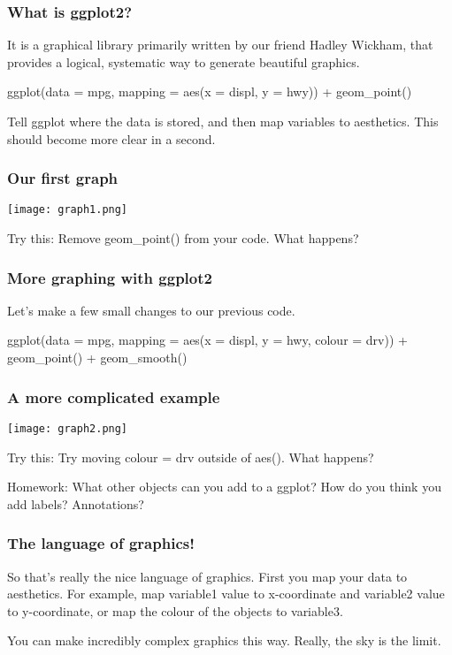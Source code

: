 \documentclass[aspectratio=169]{beamer}
\begin{document}
	\begin{frame}[fragile]
		\frametitle{What is ggplot2?}
		It is a graphical library primarily written by our friend Hadley Wickham, that provides a logical, systematic way to generate beautiful graphics.
		
		\begin{semiverbatim}
        ggplot(data = mpg, mapping = aes(x = displ, y = hwy)) + 
        geom_point()
		\end{semiverbatim}
	
	Tell ggplot where the data is stored, and then map variables to aesthetics. This should become more clear in a second.
		
	\end{frame}

	\begin{frame}[fragile]
	\frametitle{Our first graph}
	
	\begin{center}
		\texttt{[image: graph1.png]}
	\end{center}
	Try this: Remove geom\_point() from your code. What happens?
	
	\end{frame}

	\begin{frame}[fragile]
		\frametitle{More graphing with ggplot2}
		
		Let's make a few small changes to our previous code.
		
		\begin{semiverbatim}
 ggplot(data = mpg, mapping = aes(x = displ, y = hwy, colour = drv)) + 
 geom_point() + geom_smooth()
		\end{semiverbatim}
		
	\end{frame}

	\begin{frame}[fragile]
		\frametitle{A more complicated example}
	
		\begin{center}
			\texttt{[image: graph2.png]}
		\end{center}
		Try this: Try moving colour = drv outside of aes(). What happens?
		
		Homework: What other objects can you add to a ggplot? How do you think you add labels? Annotations? 
		
	\end{frame}
	

	\begin{frame}[fragile]
		\frametitle{The language of graphics!}
		
		So that's really the nice language of graphics. First you map your data to aesthetics. For example, map variable1 value to x-coordinate and variable2 value to y-coordinate, or map the colour of the objects to variable3.
		
		You can make incredibly complex graphics this way. Really, the sky is the limit.  
		
	\end{frame}
\end{document}

